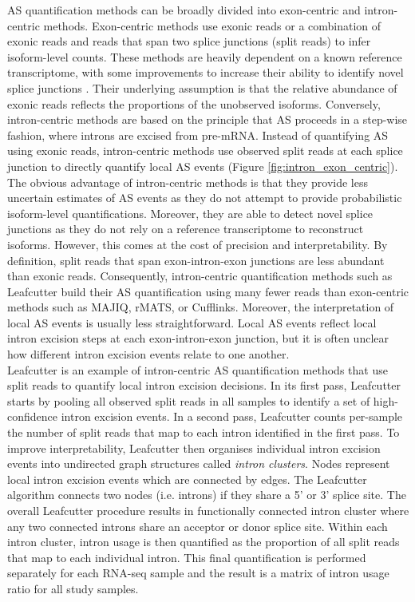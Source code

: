 AS quantification methods can be broadly divided into exon-centric and intron-centric methods. Exon-centric methods use exonic reads or a combination of exonic reads and reads that span two splice junctions (split reads) to infer isoform-level counts. These methods are heavily dependent on a known reference transcriptome, with some improvements to increase their ability to identify novel splice junctions \cite{Vaquero-Garcia2016-dv}. Their underlying assumption is that the relative abundance of exonic reads reflects the proportions of the unobserved isoforms. Conversely, intron-centric methods are based on the principle that AS proceeds in a step-wise fashion, where introns are excised from pre-mRNA. Instead of quantifying AS using exonic reads, intron-centric methods use observed split reads at each splice junction to directly quantify local AS events (Figure \ref{fig:intron_exon_centric}). The obvious advantage of intron-centric methods is that they provide less uncertain estimates of AS events as they do not attempt to provide probabilistic isoform-level quantifications. Moreover, they are able to detect novel splice junctions as they do not rely on a reference transcriptome to reconstruct isoforms. However, this comes at the cost of precision and interpretability. By definition, split reads that span exon-intron-exon junctions are less abundant than exonic reads. Consequently, intron-centric quantification methods such as Leafcutter build their AS quantification using many fewer reads than exon-centric methods such as MAJIQ, rMATS, or Cufflinks. Moreover, the interpretation of local AS events is usually less straightforward. Local AS events reflect local intron excision steps at each exon-intron-exon junction, but it is often unclear how different intron excision events relate to one another. \\

Leafcutter is an example of intron-centric AS quantification methods that use split reads to quantify local intron excision decisions. In its first pass, Leafcutter starts by pooling all observed split reads in all samples to identify a set of high-confidence intron excision events. In a second pass, Leafcutter counts per-sample the number of split reads that map to each intron identified in the first pass. To improve interpretability, Leafcutter then organises individual intron excision events into undirected graph structures called \textit{intron clusters}. Nodes represent local intron excision events which are connected by edges. The Leafcutter algorithm connects two nodes (i.e. introns) if they share a 5' or 3' splice site. The overall Leafcutter procedure results in functionally connected intron cluster where any two connected introns share an acceptor or donor splice site. Within each intron cluster, intron usage is then quantified as the proportion of all split reads that map to each individual intron. This final quantification is performed separately for each RNA-seq sample and the result is a matrix of intron usage ratio for all study samples. 



